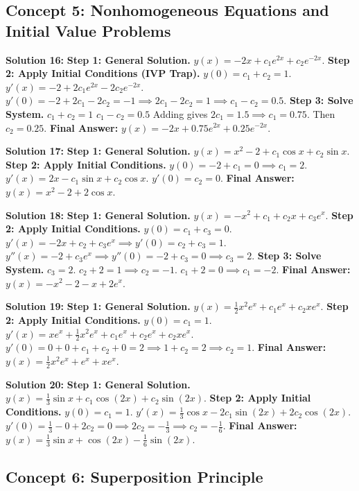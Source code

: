 \documentclass[12pt]{article}
\begin{document}
\subsection*{Concept 5: Nonhomogeneous Equations and Initial Value Problems}

\textbf{Solution 16:}
\textbf{Step 1: General Solution.} $y(x) = -2x + c_1e^{2x} + c_2e^{-2x}$.
\textbf{Step 2: Apply Initial Conditions (IVP Trap).}
$y(0) = c_1 + c_2 = 1$.
$y'(x) = -2 + 2c_1e^{2x} - 2c_2e^{-2x}$.
$y'(0) = -2 + 2c_1 - 2c_2 = -1 \implies 2c_1 - 2c_2 = 1 \implies c_1 - c_2 = 0.5$.
\textbf{Step 3: Solve System.}
$c_1 + c_2 = 1$
$c_1 - c_2 = 0.5$
Adding gives $2c_1 = 1.5 \implies c_1 = 0.75$. Then $c_2 = 0.25$.
\textbf{Final Answer:} $y(x) = -2x + 0.75e^{2x} + 0.25e^{-2x}$.

\textbf{Solution 17:}
\textbf{Step 1: General Solution.} $y(x) = x^2 - 2 + c_1\cos x + c_2\sin x$.
\textbf{Step 2: Apply Initial Conditions.}
$y(0) = -2 + c_1 = 0 \implies c_1 = 2$.
$y'(x) = 2x - c_1\sin x + c_2\cos x$.
$y'(0) = c_2 = 0$.
\textbf{Final Answer:} $y(x) = x^2 - 2 + 2\cos x$.

\textbf{Solution 18:}
\textbf{Step 1: General Solution.} $y(x) = -x^2 + c_1 + c_2x + c_3e^x$.
\textbf{Step 2: Apply Initial Conditions.}
$y(0) = c_1 + c_3 = 0$.
$y'(x) = -2x + c_2 + c_3e^x \implies y'(0) = c_2 + c_3 = 1$.
$y''(x) = -2 + c_3e^x \implies y''(0) = -2 + c_3 = 0 \implies c_3 = 2$.
\textbf{Step 3: Solve System.}
$c_3 = 2$.
$c_2 + 2 = 1 \implies c_2 = -1$.
$c_1 + 2 = 0 \implies c_1 = -2$.
\textbf{Final Answer:} $y(x) = -x^2 - 2 - x + 2e^x$.

\textbf{Solution 19:}
\textbf{Step 1: General Solution.} $y(x) = \frac{1}{2}x^2e^x + c_1e^x + c_2xe^x$.
\textbf{Step 2: Apply Initial Conditions.}
$y(0) = c_1 = 1$.
$y'(x) = xe^x + \frac{1}{2}x^2e^x + c_1e^x + c_2e^x + c_2xe^x$.
$y'(0) = 0 + 0 + c_1 + c_2 + 0 = 2 \implies 1 + c_2 = 2 \implies c_2 = 1$.
\textbf{Final Answer:} $y(x) = \frac{1}{2}x^2e^x + e^x + xe^x$.

\textbf{Solution 20:}
\textbf{Step 1: General Solution.} $y(x) = \frac{1}{3}\sin x + c_1\cos(2x) + c_2\sin(2x)$.
\textbf{Step 2: Apply Initial Conditions.}
$y(0) = c_1 = 1$.
$y'(x) = \frac{1}{3}\cos x - 2c_1\sin(2x) + 2c_2\cos(2x)$.
$y'(0) = \frac{1}{3} - 0 + 2c_2 = 0 \implies 2c_2 = -\frac{1}{3} \implies c_2 = -\frac{1}{6}$.
\textbf{Final Answer:} $y(x) = \frac{1}{3}\sin x + \cos(2x) - \frac{1}{6}\sin(2x)$.

\subsection*{Concept 6: Superposition Principle}
\end{document}
